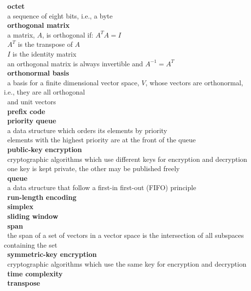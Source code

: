 \documentclass[10pt,letterpaper]{scrartcl}
\newcommand{\tbul}{\textbullet}
\newcommand{\tend}{\>\textendash}
\newcommand{\tasc}{\>\>\textasteriskcentered}
\begin{document}
\begin{tabbing}
\tbul\ \textbf{octet} \\ 
    \tend\ a sequence of eight bits, i.e., a byte \\
\tbul\ \textbf{orthogonal matrix} \\
    \tend\ a matrix, $A$, is orthogonal if: $A^TA=I$ \\
        \tasc\ $A^T$ is the transpose of $A$ \\
        \tasc\ $I$ is the identity matrix \\
    \tend\ an orthogonal matrix is always invertible and $A^{-1} = A^T$ \\
\tbul\ \textbf{orthonormal basis} \\
    \tend\ a basis for a finite dimensional vector space, $V$, whose vectors are orthonormal, i.e., they are all orthogonal \\ \>\ and unit vectors \\
\tbul\ \textbf{prefix code} \\
\tbul\ \textbf{priority queue} \\
    \tend\ a data structure which orders its elements by priority \\
    \tend\ elements with the highest priority are at the front of the queue \\
\tbul\ \textbf{public-key encryption} \\
    \tend\ cryptographic algorithms which use different keys for encryption and decryption \\
    \tend\ one key is kept private, the other may be published freely \\
\tbul\ \textbf{queue} \\
    \tend\ a data structure that follow a first-in first-out (FIFO) principle \\
\tbul\ \textbf{run-length encoding} \\
\tbul\ \textbf{simplex} \\
\tbul\ \textbf{sliding window} \\
\tbul\ \textbf{span} \\
    \tend\ the span of a set of vectors in a vector space is the intersection of all subspaces containing the set \\
\tbul\ \textbf{symmetric-key encryption} \\
    \tend\ cryptographic algorithms which use the same key for encryption and decryption \\
\tbul\ \textbf{time complexity} \\
\tbul\ \textbf{transpose} \\

\end{tabbing}
\end{document}
